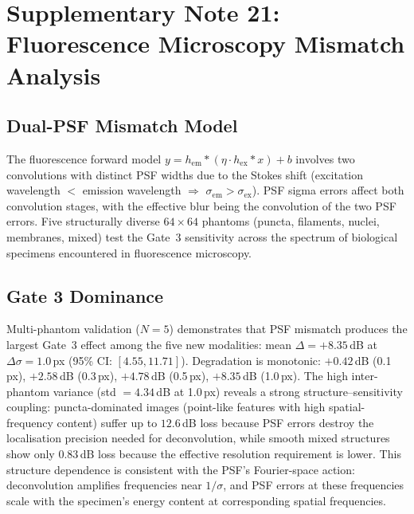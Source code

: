 \documentclass[11pt]{article}
\theoremstyle{definition}
\begin{document}
\section{Supplementary Note 21: Fluorescence Microscopy Mismatch Analysis}
\label{sec:note_fluorescence}

\subsection{Dual-PSF Mismatch Model}
The fluorescence forward model $y = h_{\mathrm{em}} * (\eta \cdot h_{\mathrm{ex}} * x) + b$ involves two convolutions with distinct PSF widths due to the Stokes shift (excitation wavelength $< $ emission wavelength $\Rightarrow$ $\sigma_{\mathrm{em}} > \sigma_{\mathrm{ex}}$). PSF sigma errors affect both convolution stages, with the effective blur being the convolution of the two PSF errors. Five structurally diverse $64 \times 64$ phantoms (puncta, filaments, nuclei, membranes, mixed) test the Gate~3 sensitivity across the spectrum of biological specimens encountered in fluorescence microscopy.

\subsection{Gate 3 Dominance}
Multi-phantom validation ($N{=}5$) demonstrates that PSF mismatch produces the largest Gate~3 effect among the five new modalities: mean $\Delta{=}+8.35$\,dB at $\Delta\sigma{=}1.0$\,px (95\% CI: $[4.55, 11.71]$). Degradation is monotonic: $+0.42$\,dB (0.1\,px), $+2.58$\,dB (0.3\,px), $+4.78$\,dB (0.5\,px), $+8.35$\,dB (1.0\,px).
The high inter-phantom variance (std $= 4.34$\,dB at 1.0\,px) reveals a strong structure--sensitivity coupling: puncta-dominated images (point-like features with high spatial-frequency content) suffer up to $12.6$\,dB loss because PSF errors destroy the localisation precision needed for deconvolution, while smooth mixed structures show only $0.83$\,dB loss because the effective resolution requirement is lower.
This structure dependence is consistent with the PSF's Fourier-space action: deconvolution amplifies frequencies near $1/\sigma$, and PSF errors at these frequencies scale with the specimen's energy content at corresponding spatial frequencies.
\end{document}

